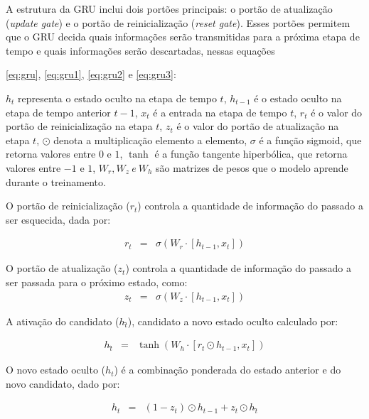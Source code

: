 A estrutura da GRU inclui dois portões principais: o portão de atualização (\textit{update gate}) e o portão de reinicialização (\textit{reset gate}). Esses portões permitem que o GRU decida quais informações serão transmitidas para a próxima etapa de tempo e quais informações serão descartadas, nessas equações 
 
 \eqref{eq:gru}, \eqref{eq:gru1}, \eqref{eq:gru2} e \eqref{eq:gru3}:
 
\( h_t \) representa o estado oculto na etapa de tempo \( t \), \( h_{t-1} \) é o estado oculto na etapa de tempo anterior \( t-1 \), \( x_t \) é a entrada na etapa de tempo \( t \), \( r_t \) é o valor do portão de reinicialização na etapa \( t \), \( z_t \) é o valor do portão de atualização na etapa \( t \), \( \odot \) denota a multiplicação elemento a elemento, \( \sigma \) é a função sigmoid, que retorna valores entre $0$ e $1$, \( \tanh \) é a função tangente hiperbólica, que retorna valores entre $-1$ e $1$, \( W_r, W_z\ e\ W_h \) são matrizes de pesos que o modelo aprende durante o treinamento.
 
O portão de reinicialização (\(r_t\)) controla a quantidade de informação do passado a ser esquecida, dada por:
 	
 	\begin{eqnarray}
 		r_t &=& \sigma(W_r \cdot [h_{t-1}, x_t])\label{eq:gru}
 	\end{eqnarray} 
 	
O portão de atualização (\(z_t\)) controla a quantidade de informação do passado a ser passada para o próximo estado, como:
 	\begin{eqnarray}
 		z_t &=& \sigma(W_z \cdot [h_{t-1}, x_t])\label{eq:gru1}
 	\end{eqnarray}
 
A ativação do candidato (\(h\widetilde{_t}\)), candidato a novo estado oculto calculado por:
 	
 	\begin{eqnarray}
 		h\widetilde{_t} &=& \tanh\left(W_h \cdot [r_t \odot h_{t-1}, x_t]\right)\label{eq:gru2}
 	\end{eqnarray}
 	
O novo estado oculto (\(h_t\)) é a combinação ponderada do estado anterior e do novo candidato, dado por:
 
 	\begin{eqnarray}
 		h_t &=& (1 - z_t) \odot h_{t-1} + z_t \odot h\widetilde{_t}\label{eq:gru3}
 	\end{eqnarray}
 
